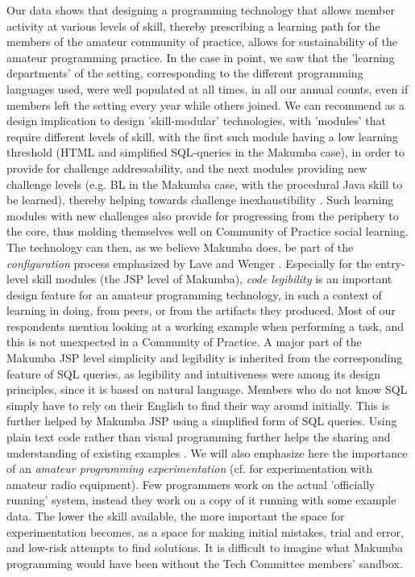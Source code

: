\documentclass{sig-alt-release2}
\begin{document}
Our data shows that designing a programming technology that allows member activity at various levels of skill, thereby prescribing a learning path for the members of the amateur community of practice, allows for sustainability of the amateur programming practice. In the case in point, we saw that the 'learning departments' of the setting, corresponding to the different programming languages used, were well populated at all times, in all our annual counts,  even if members left the setting every year while others joined. We can recommend as a design implication to design 'skill-modular' technologies, with 'modules' that require different levels of skill, with the first such module having a low learning threshold (HTML and simplified SQL-queries in the Makumba case), in order to provide for challenge addressability, and the next modules providing new challenge levels (e.g. BL in the Makumba case, with the procedural Java skill to be learned), thereby helping towards challenge inexhaustibility \cite{bogdan_bowers07}. Such learning modules with new challenges also provide for progressing from the periphery to the core, thus molding themselves well on Community of Practice social learning. The technology can then, as we believe Makumba does, be part of the \textit{configuration} process emphasized by Lave and Wenger \cite{lave_wenger91}. Especially for the entry-level skill modules (the JSP level of Makumba), \textit{code legibility} is an important design feature for an amateur programming technology, in such a context of learning in doing, from peers, or from the artifacts they produced. 
Most of our respondents mention looking at a working example when performing a task, and this is not unexpected in a Community of Practice. A major part of the Makumba JSP level simplicity and legibility is inherited from the corresponding feature of SQL queries, as legibility and intuitiveness were among its design principles, since it is based on natural language. Members who do not know SQL simply have to rely on their English to find their way around initially. This is further helped by Makumba JSP using a simplified form of SQL queries. Using plain text code rather than visual programming further helps the sharing and understanding of existing examples \cite{yamauchi00}. We will also emphasize here the importance of an \textit{amateur programming experimentation} (cf.  \cite{bogdan_bowers07} for experimentation with amateur radio equipment).
Few programmers work on the actual 'officially running' system, instead they work on a copy of it running with some example data. The lower the skill available, the more important the space for experimentation becomes, as a space for making initial mistakes, trial and error, and low-risk attempts to find solutions. It is difficult to imagine what Makumba programming would have been without the Tech Committee members' sandbox.
\end{document}
